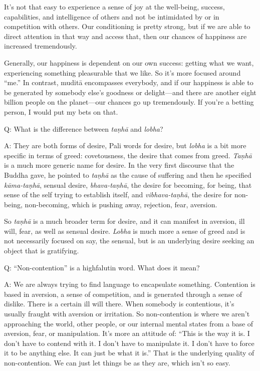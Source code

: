 It’s not that easy to experience a sense of joy at the well-being,
success, capabilities, and intelligence of others and not be intimidated
by or in competition with others. Our conditioning is pretty strong, but
if we are able to direct attention in that way and access that, then our
chances of happiness are increased tremendously.

Generally, our happiness is dependent on our own success: getting what
we want, experiencing something pleasurable that we like. So it’s more
focused around “me.” In contrast, muditā encompasses everybody, and if
our happiness is able to be generated by somebody else’s goodness or
delight—and there are another eight billion people on the planet—our
chances go up tremendously. If you’re a betting person, I would put my
bets on that.

\qaspace
Q: What is the difference between \emph{taṇhā} and \emph{lobha}?

\qaspace
A: They are both forms of desire, Pali words for desire, but
\emph{lobha} is a bit more specific in terms of greed: covetousness, the
desire that comes from greed. \emph{Taṇhā} is a much more generic name
for desire. In the very first discourse that the Buddha gave, he pointed
to \emph{taṇhā} as the cause of suffering and then he specified
\emph{kāma-taṇhā}, sensual desire, \emph{bhava-taṇhā}, the desire for
becoming, for being, that sense of the self trying to establish itself,
and \emph{vibhava-taṇhā}, the desire for non-being, non-becoming, which
is pushing away, rejection, fear, aversion.

So \emph{taṇhā} is a much broader term for desire, and it can manifest
in aversion, ill will, fear, as well as sensual desire. \emph{Lobha} is
much more a sense of greed and is not necessarily focused on say, the
sensual, but is an underlying desire seeking an object that is
gratifying.

\qaspace
Q: “Non-contention” is a highfalutin word. What does it mean?

\qaspace
A: We are always trying to find language to encapsulate something.
Contention is based in aversion, a sense of competition, and is
generated through a sense of dislike. There is a certain ill will there.
When somebody is contentious, it’s usually fraught with aversion or
irritation. So non-contention is where we aren’t approaching the world,
other people, or our internal mental states from a base of aversion,
fear, or manipulation. It’s more an attitude of: “This is the way it is.
I don’t have to contend with it. I don’t have to manipulate it. I don’t
have to force it to be anything else. It can just be what it is.” That
is the underlying quality of non-contention. We can just let things be
as they are, which isn’t so easy.

